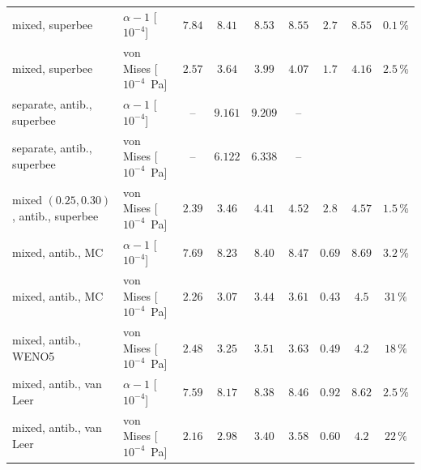 \documentclass[11pt,a4paper]{article}
\begin{document}
\begin{table}[htbp]
\begin{tabular}{llccccccc}
    mixed, superbee & $\alpha-1$ [$10^{-4}$] & $7.84$ & $8.41$ & $8.53$ & $8.55$ & $2.7$ & $8.55$ & $0.1\,\%$ \\
    mixed, superbee & von Mises [$10^{-4}$~Pa] & $2.57$ & $3.64$ & $3.99$ & $4.07$ & $1.7$ & $4.16$ & $2.5\,\%$ \\
    separate, antib., superbee & $\alpha-1$ [$10^{-4}$] & -- & $9.161$ & $9.209$ & -- & & & \\
    separate, antib., superbee & von Mises [$10^{-4}$~Pa] & -- & $6.122$ & $6.338$ & -- & & & \\
    mixed $(0.25,0.30)$, antib., superbee & von Mises [$10^{-4}$~Pa] & $2.39$ & $3.46$ & $4.41$ & $4.52$ & $2.8$ & $4.57$ & $1.5\,\%$ \\
    mixed, antib., MC & $\alpha-1$ [$10^{-4}$] & $7.69$ & $8.23$ & $8.40$ & $8.47$ & $0.69$ & $8.69$ & $3.2\,\%$ \\
    mixed, antib., MC & von Mises [$10^{-4}$~Pa] & $2.26$ & $3.07$ & $3.44$ & $3.61$ & $0.43$ & $4.5$ & $31\,\%$ \\
    mixed, antib., WENO5 & von Mises [$10^{-4}$~Pa] & $2.48$ & $3.25$ & $3.51$ & $3.63$ & $0.49$ & $4.2$ & $18\,\%$ \\
    mixed, antib., van Leer & $\alpha-1$ [$10^{-4}$] & $7.59$ & $8.17$ & $8.38$ & $8.46$ & $0.92$ & $8.62$ & $2.5\,\%$ \\
    mixed, antib., van Leer & von Mises [$10^{-4}$~Pa] & $2.16$ & $2.98$ & $3.40$ & $3.58$ & $0.60$ & $4.2$ & $22\,\%$ \\
    \bottomrule
\end{tabular}
\end{table}
\end{document}
